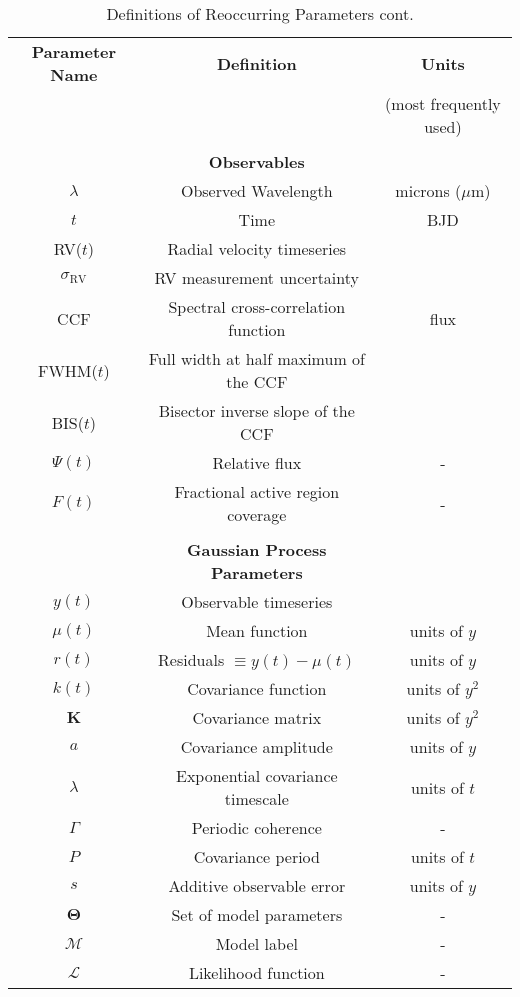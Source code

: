 \begin{table*}
\caption{Definitions of Reoccurring Parameters cont.}
\label{table:paramdefs2}
\begin{tabular}{ccc}
  \hline
  \hline
  \textbf{Parameter Name} & \textbf{Definition} & \textbf{Units} \\
  & & (most frequently used) \\
  \hline
  && \\
  & \textbf{Observables} & \\
  \hline
  $\lambda$ & Observed Wavelength & microns ($\mu$m) \\
  $t$ & Time & BJD \\
  RV($t$) & Radial velocity timeseries & \mps{} \\
  $\sigma_{\mathrm{RV}}$ & RV measurement uncertainty & \mps{} \\
  CCF & Spectral cross-correlation function & flux \\ 
  FWHM($t$) & Full width at half maximum of the CCF & \mps{} \\
  BIS($t$) & Bisector inverse slope of the CCF & \mps{} \\
  $\Psi(t)$ & Relative flux & - \\
  $F(t)$ & Fractional active region coverage & - \\
  \hline
  && \\
  & \textbf{Gaussian Process Parameters} & \\
  \hline
  $y(t)$ & Observable timeseries & \mps{} \\
  $\mu(t)$ & Mean function & units of $y$ \\
  $r(t)$ & Residuals $\equiv y(t)-\mu(t)$ & units of $y$ \\ 
  $k(t)$ & Covariance function & units of $y^2$ \\
  $\mathbf{K}$ & Covariance matrix & units of $y^2$ \\
  $a$ & Covariance amplitude & units of $y$ \\
  $\lambda$ & Exponential covariance timescale & units of $t$ \\
  $\Gamma$ & Periodic coherence & - \\
  $P$ & Covariance period & units of $t$ \\
  $s$ & Additive observable error & units of $y$ \\
  $\mathbf{\Theta}$ & Set of model parameters & - \\
  $\mathcal{M}$ & Model label & - \\
  $\mathcal{L}$ & Likelihood function & - \\ 
  \end{tabular}
\end{table*}

